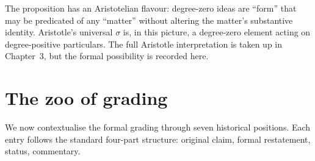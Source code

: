 \begin{remark}
The proposition has an Aristotelian flavour: degree-zero ideas are
``form'' that may be predicated of any ``matter'' without altering
the matter's substantive identity. Aristotle's universal $\sigma$ is,
in this picture, a degree-zero element acting on degree-positive
particulars. The full Aristotle interpretation is taken up in
Chapter~3, but the formal possibility is recorded here.
\end{remark}



\section{The zoo of grading}\label{sec:grading-zoo}

We now contextualise the formal grading through seven historical
positions. Each entry follows the standard four-part structure:
original claim, formal restatement, status, commentary.

